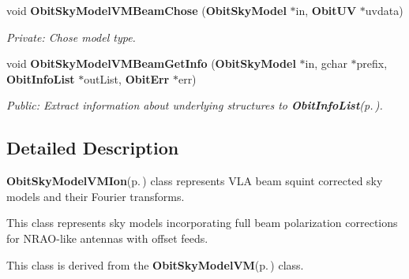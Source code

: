\begin{CompactItemize}
void {\bf Obit\-Sky\-Model\-VMBeam\-Chose} ({\bf Obit\-Sky\-Model} $\ast$in, {\bf Obit\-UV} $\ast$uvdata)
\begin{CompactList}\small\item\em Private: Chose model type. \item\end{CompactList}\item 
void {\bf Obit\-Sky\-Model\-VMBeam\-Get\-Info} ({\bf Obit\-Sky\-Model} $\ast$in, gchar $\ast$prefix, {\bf Obit\-Info\-List} $\ast$out\-List, {\bf Obit\-Err} $\ast$err)
\begin{CompactList}\small\item\em Public: Extract information about underlying structures to {\bf Obit\-Info\-List}{\rm (p.\,\pageref{structObitInfoList})}. \item\end{CompactList}\end{CompactItemize}


\subsection{Detailed Description}
{\bf Obit\-Sky\-Model\-VMIon}{\rm (p.\,\pageref{structObitSkyModelVMIon})} class represents VLA beam squint corrected sky models and their Fourier transforms. 

This class represents sky models incorporating full beam polarization corrections for NRAO-like antennas with offset feeds.

This class is derived from the {\bf Obit\-Sky\-Model\-VM}{\rm (p.\,\pageref{structObitSkyModelVM})} class.

